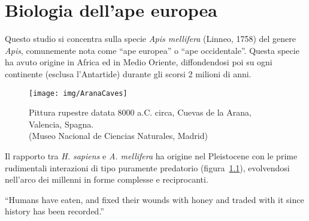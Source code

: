 \chapter{Biologia dell'ape europea}
\label{chap:bio}
Questo studio si concentra sulla specie \emph{Apis mellifera} (Linneo, 1758) del genere \emph{Apis},
comunemente nota come ``ape europea'' o ``ape occidentale''.
Questa specie ha avuto origine in Africa ed in Medio Oriente, diffondendosi poi su ogni continente (esclusa l'Antartide) durante gli scorsi 2 milioni di anni.

\begin{figure}
    \centering
    \texttt{[image: img/AranaCaves]}

    \caption[Pittura rupestre di Arana.]{Pittura rupestre datata 8000 a.C. circa, Cuevas de la Arana, Valencia, Spagna. \\ (Museo Nacional de Ciencias Naturales, Madrid)}
    \label{img:arana}
\end{figure}

Il rapporto tra \emph{H. sapiens} e \emph{A. mellifera} ha origine nel Pleistocene con le prime rudimentali interazioni
di tipo puramente predatorio (figura~\ref{img:arana}), evolvendosi nell'arco dei millenni in forme complesse e reciprocanti.

\begin{displayquote}
``Humans have eaten, and fixed their wounds with honey and traded with it since history has been recorded.''
\end{displayquote}

